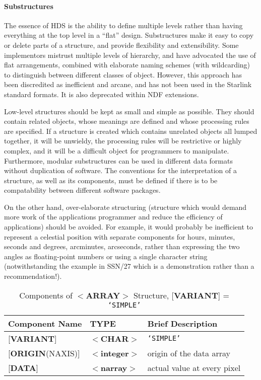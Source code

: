 \documentclass[twoside,11pt]{article}
\newcommand{\xref}[3]{#1}
\renewcommand{\_}{\texttt{\symbol{95}}}
\begin{document}
\paragraph{Substructures}
The essence of HDS is the ability to define
multiple levels rather than having everything at the
top level in a ``flat'' design.
Substructures make it easy to copy or delete parts of a structure, and
provide flexibility and extensibility.  Some implementors
mistrust multiple levels of hierarchy, and have advocated
the use of flat arrangements, combined with elaborate
naming schemes (with wildcarding) to distinguish between different
classes of object.  However, this approach has been
discredited as inefficient and arcane, and has not been used
in the Starlink standard formats.  It is also deprecated
within NDF extensions.

Low-level structures should be kept as small and simple as possible.
They should contain related objects, whose meanings are defined and
whose processing rules are specified.  If a
structure is created
which contains unrelated objects all lumped together, it
will be unwieldy, the
processing rules will be restrictive or highly complex, and it will
be a difficult object for programmers to manipulate.  Furthermore,
modular substructures can be used in different data formats without
duplication of software. The conventions for the interpretation of a
structure, as well as its components,
must be defined if there is to be compatability between
different software packages. 

On the other hand, over-elaborate structuring (structure which would
demand more work of the applications programmer and reduce the
efficiency of applications) should be avoided.  For example, it
would probably be inefficient to represent a
celestial position with separate components for hours, minutes, seconds
and degrees, arcminutes, arcseconds, rather than expressing
the two angles as floating-point numbers or using
a single character string (notwithstanding the example in 
\xref{SSN/27}{ssn27}, which is a demonstration rather than a recommendation!). 

\begin{table}[htb]
\centering
\caption{Components of $<${\bf ARRAY}$>$ Structure,
{[}{\bf VARIANT}{]} = {\tt `SIMPLE'}}
\label{ta:example2}
\begin{tabular}{|l|l|l|}
\hline
Component Name  & TYPE & Brief Description \\ \hline
{[}{\bf VARIANT}{]} & $<${\bf \_CHAR}$>$ & {\tt `SIMPLE'} \\
{[}{\bf ORIGIN}(NAXIS){]} & $<${\bf integer}$>$ & origin of the data array \\
{[}{\bf DATA}{]} & $<${\bf narray}$>$ & actual value at every pixel \\ \hline
\end{tabular}
\end{table}
\end{document}
